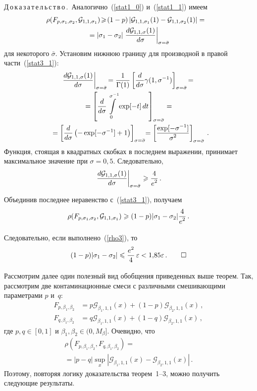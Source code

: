 \begin{multicols}{2}
\smallskip

\noindent
Д\,о\,к\,а\,з\,а\,т\,е\,л\,ь\,с\,т\,в\,о\,.\
Аналогично~(\ref{stat1_0}) и~(\ref{stat1_1}) имеем
\begin{multline}
\hspace*{-1.13pt}\!\!\!\rho(F_{p,\sigma_1,\sigma_2}, {\mathcal G}_{1,1,\sigma_1} )
\!\geqslant\! (1-p) \left|{\mathcal G}_{1,1,\sigma_1}(1) - {\mathcal
G}_{1,1,\sigma_2}(1)\right| ={}\\
{}= \left|\sigma_1-\sigma_2\right| \left.\displaystyle\frac{\displaystyle d{\mathcal
G}_{1,1,\sigma}(1)\mathstrut}{\displaystyle d\sigma\mathstrut}\right|_{\sigma = \bar\sigma}
\label{stat3_1}
\end{multline}
для некоторого $\bar\sigma$.
Установим нижнюю границу для производной в правой части~(\ref{stat3_1}):
\begin{multline*}
\left.\displaystyle\frac{\displaystyle d{\mathcal G}_{1,1,\sigma}(1)\mathstrut}{\displaystyle d\sigma\mathstrut}\right|_{\sigma = \bar\sigma}\! = 
\displaystyle\frac{\displaystyle 1\mathstrut}{\displaystyle \Gamma(1)\mathstrut}
\left[\displaystyle\frac{\displaystyle d\mathstrut}{\displaystyle d\sigma\mathstrut}\gamma(1,\sigma^{-1})\right]_{\sigma =\bar\sigma}\!={}\\
{}= \left[\displaystyle\frac{\displaystyle d\mathstrut}{\displaystyle d\sigma\mathstrut} \int\limits_0^{\sigma^{-1}} \exp[-t]\, dt \right]_{\sigma = \bar\sigma} ={}\\
\!{}= 
\left[\displaystyle\frac{\displaystyle d\mathstrut}{\displaystyle d\sigma\mathstrut} \left(-\exp[-\sigma^{-1}]+1\right)
\right]_{\sigma = \bar\sigma}\!\! =
\left[\displaystyle\frac{\displaystyle \exp[-\sigma^{-1}]\mathstrut}{\displaystyle \sigma^2\mathstrut} \right]_{\sigma =\bar\sigma}\,.\hspace*{-4.94658pt}
\end{multline*}
Функция, стоящая в квадратных скобках в последнем выражении,
принимает максимальное значение при $\sigma=0{,}5$. Следовательно,
$$
\left.\displaystyle\frac{\displaystyle d{\mathcal G}_{1,1,\sigma}(1)\mathstrut}{\displaystyle d\sigma\mathstrut}\right|_{\sigma
= \bar\sigma} \geqslant \displaystyle\frac{\displaystyle 4\mathstrut}{\displaystyle e^2\mathstrut}\,.
$$

Объединив последнее неравенство с~(\ref{stat3_1}), получаем
$$
\rho(F_{p,\sigma_1,\sigma_2}, {\mathcal G}_{1,1,\sigma_1} ) \geqslant (1-p) |\sigma_1-\sigma_2| \displaystyle\frac{\displaystyle 4\mathstrut}{\displaystyle e^2\mathstrut}\,.
$$

Следовательно, если выполнено~(\ref{rho3}), то
$$
(1-p) |\sigma_1-\sigma_2| \leqslant \displaystyle\frac{\displaystyle e^2\mathstrut}{\displaystyle 4\mathstrut}\,\varepsilon < 1{,}85  \varepsilon\,.~~~~~~\square
$$


Рассмотрим далее один полезный вид обобщения приведенных выше
теорем. Так, рассмотрим две контаминационные смеси с различными
смешивающими параметрами $p$ и~$q$:
\begin{align*}
F_{p,\beta_1,\beta_2} &= p {\mathcal G}_{\beta_1,1,1}(x) + (1-p){\mathcal G}_{\beta_2,1,1}(x)\,,\\
F_{q,\beta_1,\beta_2} &= q {\mathcal G}_{\beta_1,1,1}(x) +
(1-q){\mathcal G}_{\beta_2,1,1}(x)\,,
\end{align*}
где $p, q\in[0,1]$ и $\beta_1,\beta_2\in (0, M_{\beta}]$.
Очевидно, что
\begin{multline*}
\rho(F_{p,\beta_1,\beta_2},F_{q,\beta_1,\beta_2}) ={}\\
{}= |p-q|
\sup\limits_x |{\mathcal G}_{\beta_1,1,1}(x) - {\mathcal
G}_{\beta_2,1,1}(x)|\,.
\end{multline*}
Поэтому, повторяя логику доказательства
теорем~1--3, можно получить следующие результаты.


\end{multicols}
